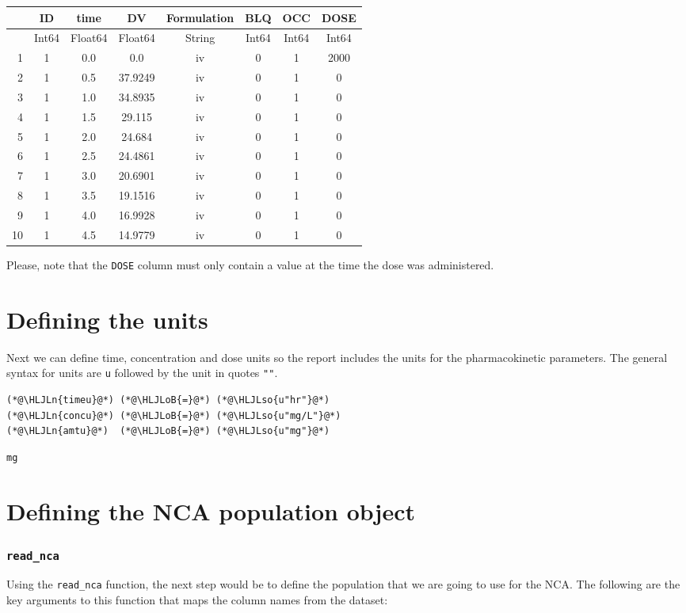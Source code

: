 \documentclass[12pt,a4paper]{article}
\newcommand{\HLJLn}[1]{#1}
\newcommand{\HLJLso}[1]{\textcolor[RGB]{201,61,57}{#1}}
\newcommand{\HLJLoB}[1]{\textcolor[RGB]{102,102,102}{\textbf{#1}}}
\begin{document}
\begin{tabular}{r|ccccccc}
	& ID & time & DV & Formulation & BLQ & OCC & DOSE\\
	\hline
	& Int64 & Float64 & Float64 & String & Int64 & Int64 & Int64\\
	\hline
	1 & 1 & 0.0 & 0.0 & iv & 0 & 1 & 2000 \\
	2 & 1 & 0.5 & 37.9249 & iv & 0 & 1 & 0 \\
	3 & 1 & 1.0 & 34.8935 & iv & 0 & 1 & 0 \\
	4 & 1 & 1.5 & 29.115 & iv & 0 & 1 & 0 \\
	5 & 1 & 2.0 & 24.684 & iv & 0 & 1 & 0 \\
	6 & 1 & 2.5 & 24.4861 & iv & 0 & 1 & 0 \\
	7 & 1 & 3.0 & 20.6901 & iv & 0 & 1 & 0 \\
	8 & 1 & 3.5 & 19.1516 & iv & 0 & 1 & 0 \\
	9 & 1 & 4.0 & 16.9928 & iv & 0 & 1 & 0 \\
	10 & 1 & 4.5 & 14.9779 & iv & 0 & 1 & 0 \\
\end{tabular}


Please, note that the \texttt{DOSE} column must only contain a value at the time the dose was administered.

\section{Defining the units}
Next we can define time, concentration and dose units so the report includes the units for the pharmacokinetic parameters. The general syntax for units are \texttt{u} followed by the unit in quotes \texttt{""}.


\begin{lstlisting}
(*@\HLJLn{timeu}@*) (*@\HLJLoB{=}@*) (*@\HLJLso{u"hr"}@*)
(*@\HLJLn{concu}@*) (*@\HLJLoB{=}@*) (*@\HLJLso{u"mg/L"}@*)
(*@\HLJLn{amtu}@*)  (*@\HLJLoB{=}@*) (*@\HLJLso{u"mg"}@*)
\end{lstlisting}

\begin{lstlisting}
mg
\end{lstlisting}


\section{Defining the NCA population object}
\subsubsection{\texttt{read\_nca}}
Using the \texttt{read\_nca} function, the next step would be to define the population that we are going to use for the NCA. The following are the key arguments to this function that maps the column names from the dataset:
\end{document}
